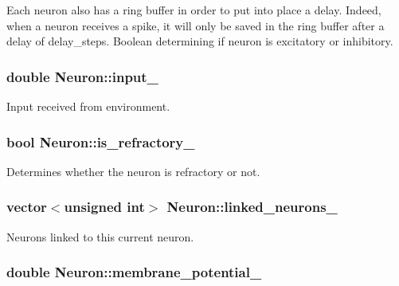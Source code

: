 Each neuron also has a ring buffer in order to put into place a delay. Indeed, when a neuron receives a spike, it will only be saved in the ring buffer after a delay of delay\-\_\-steps. Boolean determining if neuron is excitatory or inhibitory. \hypertarget{classNeuron_a9ed47eb032d964fdebc77bca888226fa}{
\subsubsection[{input\-\_\-}]{\setlength{\rightskip}{0pt plus 5cm}double Neuron\-::input\-\_\-\hspace{0.3cm}{\ttfamily [private]}}}\label{classNeuron_a9ed47eb032d964fdebc77bca888226fa}
Input received from environment. \hypertarget{classNeuron_a16f9f6f89c1bc27ca4f2cfa868c640d5}{
\subsubsection[{is\-\_\-refractory\-\_\-}]{\setlength{\rightskip}{0pt plus 5cm}bool Neuron\-::is\-\_\-refractory\-\_\-\hspace{0.3cm}{\ttfamily [private]}}}\label{classNeuron_a16f9f6f89c1bc27ca4f2cfa868c640d5}
Determines whether the neuron is refractory or not. \hypertarget{classNeuron_a71f410f0b2026456ab554bfb6f1b4b9e}{
\subsubsection[{linked\-\_\-neurons\-\_\-}]{\setlength{\rightskip}{0pt plus 5cm}vector$<$unsigned int$>$ Neuron\-::linked\-\_\-neurons\-\_\-\hspace{0.3cm}{\ttfamily [private]}}}\label{classNeuron_a71f410f0b2026456ab554bfb6f1b4b9e}
Neurons linked to this current neuron. \hypertarget{classNeuron_a58829bf280bb52776e8842c71a92af4a}{
\subsubsection[{membrane\-\_\-potential\-\_\-}]{\setlength{\rightskip}{0pt plus 5cm}double Neuron\-::membrane\-\_\-potential\-\_\-\hspace{0.3cm}{\ttfamily [private]}}}\label{classNeuron_a58829bf280bb52776e8842c71a92af4a}
